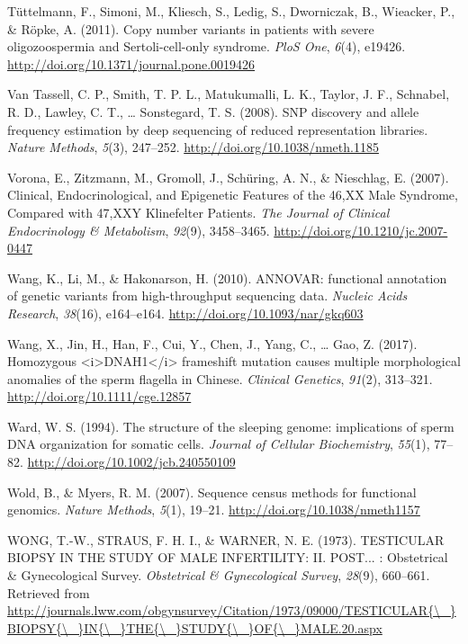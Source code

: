 \documentclass[12pt,twoside]{reedthesis}
\theoremstyle{definition}
\theoremstyle{definition}
\theoremstyle{remark}
\begin{document}
  \hypertarget{ref-Tuttelmann2011}{}
  Tüttelmann, F., Simoni, M., Kliesch, S., Ledig, S., Dworniczak, B.,
  Wieacker, P., \& Röpke, A. (2011). Copy number variants in patients with
  severe oligozoospermia and Sertoli-cell-only syndrome. \emph{PloS One},
  \emph{6}(4), e19426. \url{http://doi.org/10.1371/journal.pone.0019426}
  
  \hypertarget{ref-VanTassell2008}{}
  Van Tassell, C. P., Smith, T. P. L., Matukumalli, L. K., Taylor, J. F.,
  Schnabel, R. D., Lawley, C. T., \ldots{} Sonstegard, T. S. (2008). SNP
  discovery and allele frequency estimation by deep sequencing of reduced
  representation libraries. \emph{Nature Methods}, \emph{5}(3), 247--252.
  \url{http://doi.org/10.1038/nmeth.1185}
  
  \hypertarget{ref-Vorona2007}{}
  Vorona, E., Zitzmann, M., Gromoll, J., Schüring, A. N., \& Nieschlag, E.
  (2007). Clinical, Endocrinological, and Epigenetic Features of the 46,XX
  Male Syndrome, Compared with 47,XXY Klinefelter Patients. \emph{The
  Journal of Clinical Endocrinology \& Metabolism}, \emph{92}(9),
  3458--3465. \url{http://doi.org/10.1210/jc.2007-0447}
  
  \hypertarget{ref-Wang2010}{}
  Wang, K., Li, M., \& Hakonarson, H. (2010). ANNOVAR: functional
  annotation of genetic variants from high-throughput sequencing data.
  \emph{Nucleic Acids Research}, \emph{38}(16), e164--e164.
  \url{http://doi.org/10.1093/nar/gkq603}
  
  \hypertarget{ref-Wang2017}{}
  Wang, X., Jin, H., Han, F., Cui, Y., Chen, J., Yang, C., \ldots{} Gao,
  Z. (2017). Homozygous
  \textless{}i\textgreater{}DNAH1\textless{}/i\textgreater{} frameshift
  mutation causes multiple morphological anomalies of the sperm flagella
  in Chinese. \emph{Clinical Genetics}, \emph{91}(2), 313--321.
  \url{http://doi.org/10.1111/cge.12857}
  
  \hypertarget{ref-Ward1994}{}
  Ward, W. S. (1994). The structure of the sleeping genome: implications
  of sperm DNA organization for somatic cells. \emph{Journal of Cellular
  Biochemistry}, \emph{55}(1), 77--82.
  \url{http://doi.org/10.1002/jcb.240550109}
  
  \hypertarget{ref-Wold2007}{}
  Wold, B., \& Myers, R. M. (2007). Sequence census methods for functional
  genomics. \emph{Nature Methods}, \emph{5}(1), 19--21.
  \url{http://doi.org/10.1038/nmeth1157}
  
  \hypertarget{ref-WONG1973}{}
  WONG, T.-W., STRAUS, F. H. I., \& WARNER, N. E. (1973). TESTICULAR
  BIOPSY IN THE STUDY OF MALE INFERTILITY: II. POST... : Obstetrical \&
  Gynecological Survey. \emph{Obstetrical \& Gynecological Survey},
  \emph{28}(9), 660--661. Retrieved from
  \href{http://journals.lww.com/obgynsurvey/Citation/1973/09000/TESTICULAR\%7B/_\%7DBIOPSY\%7B/_\%7DIN\%7B/_\%7DTHE\%7B/_\%7DSTUDY\%7B/_\%7DOF\%7B/_\%7DMALE.20.aspx}{http://journals.lww.com/obgynsurvey/Citation/1973/09000/TESTICULAR\{\textbackslash{}\_\}BIOPSY\{\textbackslash{}\_\}IN\{\textbackslash{}\_\}THE\{\textbackslash{}\_\}STUDY\{\textbackslash{}\_\}OF\{\textbackslash{}\_\}MALE.20.aspx}
  
\end{document}
